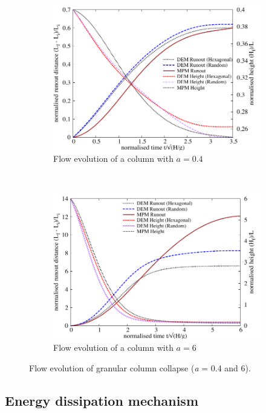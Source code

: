 \begin{figure}[tbhp]
\centering
\begin{subfigure}[b]{0.975\textwidth}
\centering
\includegraphics[width=\textwidth]{flowa04}
\caption{Flow evolution of a column with $a=0.4$}
\label{fig:flowa04}
\end{subfigure}
\\
\begin{subfigure}[b]{0.975\textwidth}
\centering
\includegraphics[width=\textwidth]{flowa6}
\caption{Flow evolution of a column with $a=6$}
\label{fig:flowa6}
\end{subfigure}
\caption{Flow evolution of granular column collapse (\textit{a} = 0.4 and 6).}
\label{fig:flow_column}
\end{figure}

\subsection{Energy dissipation mechanism}
\label{sec:energy}

